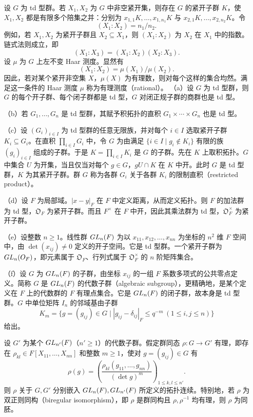 设 $G$ 为 td 型群。若 $X_1,X_2$ 为 $G$ 中非空紧开集，则存在 $G$ 的紧开子群 $K$，使 $X_1,X_2$ 都是有限多个陪集之并：分别为 $x_{1,1}K,\ldots,x_{1,n_1}K$ 与 $x_{2,1}K,\ldots,x_{2,n_2}K$。令
\[
(X_1:X_2)=n_1/n_2.\tag{1}
\]
例如，若 $X_1,X_2$ 为紧开子群且 $X_2\subseteq X_1$，则 $(X_1:X_2)$ 为 $X_2$ 在 $X_1$ 中的指数。链式法则成立，即
\[
(X_1:X_3)=(X_1:X_2)(X_2:X_3).\tag{2}
\]
设 $\mu$ 为 $G$ 上左不变 Haar 测度。显然有
\[
(X_1:X_2)=\mu(X_1)/\mu(X_2).\tag{3}
\]
因此，若对某个紧开非空集 $X$，$\mu(X)$ 为有理数，则对每个这样的集合均然。满足这一条件的 Haar 测度 $\mu$ 称为有理测度（rational）。
（a）设 $G$ 为 td 型群，则 $G$ 的每个开子群、每个闭子群都是 td 型，$G$ 对闭正规子群的商群也是 td 型。

（b）若 $G_1,\ldots,G_n$ 是 td 型群，其赋予积拓扑的直积 $G_1\times\cdots\times G_n$ 也是 td 型。

（c）设 $(G_i)_{i\in I}$ 为 td 型群的任意无限族，并对每个 $i\in I$ 选取紧开子群 $K_i\subseteq G_i$。在直积 $\prod_{i\in I}G_i$ 中，令 $G$ 为由满足 $\{i\in I\mid g_i\notin K_i\}$ 有限的族 $(g_i)_{i\in I}$ 组成的子群。于是 $K=\prod_{i\in I}K_i$ 是 $G$ 的子群。先在 $K$ 上取积拓扑。$G$ 中集合 $U$ 为开集，当且仅当对每个 $g\in G$，$gU\cap K$ 在 $K$ 中开。此时 $G$ 是 td 型群，$K$ 为其紧开子群。群 $G$ 称为各群 $G_i$ 关于各群 $K_i$ 的限制直积（restricted product）。

（d）设 $F$ 为局部域。$|x-y|_F$ 在 $F$ 中定义距离，从而定义拓扑。则 $F$ 的加法群为 td 型，$\mathfrak O_F$ 为紧开子群。而且 $F^\times$ 在 $F$ 中开，因此其乘法群为 td 型，$\mathfrak O_F^\times$ 为紧开子群。

（e）设整数 $n\geq1$。线性群 $GL_n(F)$ 为以 $x_{11},x_{12},\ldots,x_{nn}$ 为坐标的 $n^2$ 维 $F$ 空间中，由 $\det(x_{ij})\ne0$ 定义的开子空间。它是 td 型群。一个紧开子群为 $GL_n(O_F)$，即元素属于 $\mathfrak O_F$、行列式属于 $\mathfrak O_F^\times$ 的 $n$ 阶矩阵集合。

（f）设 $G$ 为 $GL_n(F)$ 的子群，由坐标 $x_{ij}$ 的一组 $F$ 系数多项式的公共零点定义。简称 $G$ 是 $GL_n(F)$ 的代数子群（algebraic subgroup），更精确地，是某个定义在 $F$ 上的代数群的 $F$ 有理点集合。它是 $GL_n(F)$ 的闭子群，故本身是 td 型群。$G$ 中单位矩阵 $I_n$ 的邻域基由子群
\[
K_m=\{g=(g_{ij})\in G\mid|g_{ij}-\delta_{ij}|_F\leq q^{-m}\ (1\leq i,j\leq n)\}
\]
给出。

设 $G'$ 为某个 $GL_{n'}(F)$（$n'\geq1$）的代数子群。假定群同态 $\rho:G\to G'$ 有理，即存在 $\rho_{kl}\in F[X_{11},\ldots,X_{nn}]$ 和整数 $m\geq1$，使对 $g=(g_{ij})\in G$ 有
\[
\rho(g)=\left(\frac{\rho_{kl}(g_{11},\ldots,g_{nn})}{(\det g)^m}\right)_{1\leq k,l\leq n'}.
\]
则 $\rho$ 关于 $G,G'$ 分别嵌入 $GL_n(F),GL_{n'}(F)$ 所定义的拓扑连续。特别地，若 $\rho$ 为双正则同构（biregular isomorphism），即 $\rho$ 是群同构且 $\rho,\rho^{-1}$ 均有理，则 $\rho$ 为同胚。


